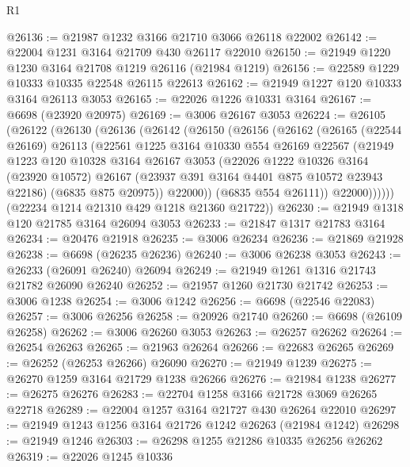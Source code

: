 \begin{lexlean}{R1}
\begin{coremodule}
@26136 := @21987 @1232 @3166 @21710 @3066 @26118 @22002
@26142 := @22004 @1231 @3164 @21709 @430 @26117 @22010
@26150 := @21949 @1220 @1230 @3164 @21708 @1219 @26116 (@21984 @1219)
@26156 := @22589 @1229 @10333 @10335 @22548 @26115 @22613
@26162 := @21949 @1227 @120 @10333 @3164 @26113 @3053
@26165 := @22026 @1226 @10331 @3164
@26167 := @6698 (@23920 @20975)
@26169 := @3006 @26167 @3053
@26224 := @26105
    (@26122
      (@26130
        (@26136
          (@26142
            (@26150
              (@26156
                (@26162
                  (@26165
                    (@22544 @26169)
                    @26113
                    (@22561
                      @1225
                      @3164
                      @10330
                      @554
                      @26169
                      @22567
                      (@21949
                        @1223
                        @120
                        @10328
                        @3164
                        @26167
                        @3053
                        (@22026
                          @1222
                          @10326
                          @3164
                          (@23920 @10572)
                          @26167
                          (@23937 @391 @3164 @4401 @875 @10572 @23943 @22186)
                          (@6835 @875 @20975))
                        @22000))
                    (@6835 @554 @26111))
                  @22000))))))
      (@22234 @1214 @21310 @429 @1218 @21360 @21722))
@26230 := @21949 @1318 @120 @21785 @3164 @26094 @3053
@26233 := @21847 @1317 @21783 @3164
@26234 := @20476 @21918
@26235 := @3006 @26234
@26236 := @21869 @21928
@26238 := @6698 (@26235 @26236)
@26240 := @3006 @26238 @3053
@26243 := @26233 (@26091 @26240) @26094
@26249 := @21949 @1261 @1316 @21743 @21782 @26090 @26240
@26252 := @21957 @1260 @21730 @21742
@26253 := @3006 @1238
@26254 := @3006 @1242
@26256 := @6698 (@22546 @22083)
@26257 := @3006 @26256
@26258 := @20926 @21740
@26260 := @6698 (@26109 @26258)
@26262 := @3006 @26260 @3053
@26263 := @26257 @26262
@26264 := @26254 @26263
@26265 := @21963 @26264
@26266 := @22683 @26265
@26269 := @26252 (@26253 @26266) @26090
@26270 := @21949 @1239
@26275 := @26270 @1259 @3164 @21729 @1238 @26266
@26276 := @21984 @1238
@26277 := @26275 @26276
@26283 := @22704 @1258 @3166 @21728 @3069 @26265 @22718
@26289 := @22004 @1257 @3164 @21727 @430 @26264 @22010
@26297 := @21949 @1243 @1256 @3164 @21726 @1242 @26263 (@21984 @1242)
@26298 := @21949 @1246
@26303 := @26298 @1255 @21286 @10335 @26256 @26262
@26319 := @22026
    @1245
    @10336

\end{coremodule}
\end{lexlean}
